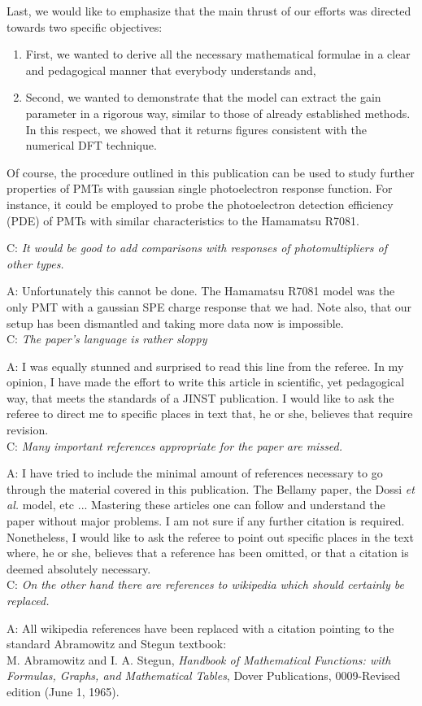 \documentclass[a4paper,11pt]{article}
\begin{document}
Last, we would like to emphasize that the main thrust of our efforts was directed towards two specific objectives:
\begin{enumerate}
\item First, we wanted to derive all the necessary mathematical formulae in a clear and pedagogical manner that everybody understands and,
\item Second, we wanted to demonstrate that the model can extract the gain parameter in a rigorous way, similar to those of already established methods. 
In this respect, we showed that it returns figures consistent with the numerical DFT technique.  
\end{enumerate}
Of course, the procedure outlined in this publication can be used to study further properties of PMTs with gaussian single photoelectron response function. 
For instance, it could be employed to probe the photoelectron detection efficiency (PDE) of PMTs with similar characteristics to the Hamamatsu R7081. 





C: \emph{It would be good to add comparisons with responses of photomultipliers of other types. }

A: Unfortunately this cannot be done. 
The Hamamatsu R7081 model was the only PMT with a gaussian SPE charge response that we had. 
Note also, that our setup has been dismantled and taking more data now is impossible.  
\\[1ex]

C: \emph{The paper's language is rather sloppy}

A: I was equally stunned and surprised to read this line from the referee. 
In my opinion, I have made the effort to write this article in scientific, yet pedagogical way, that meets the standards of a JINST publication. 
I would like to ask the referee to direct me to specific places in text that, he or she, believes that require revision. 
\\[1ex]

C: \emph{Many important references appropriate for the paper are missed.}

A: I have tried to include the minimal amount of references necessary to go through the material covered in this publication. 
The Bellamy paper, the Dossi \emph{et al.} model, etc ... Mastering these articles one can follow and understand the paper without major problems. 
I am not sure if any further citation is required. 
Nonetheless, I would like to ask the referee to point out specific places in the text where, he or she, believes that a reference has been omitted, or that a citation is deemed absolutely necessary.  
\\[1ex]

C: \emph{On the other hand there are references to wikipedia which should certainly be replaced. }

A: All wikipedia references have been replaced with a citation pointing to the standard Abramowitz and Stegun textbook:
\\[1ex]

M. Abramowitz and I. A. Stegun, \emph{Handbook of Mathematical Functions: with Formulas, Graphs, and Mathematical Tables}, Dover Publications, 0009-Revised edition (June 1, 1965).  
\end{document}
